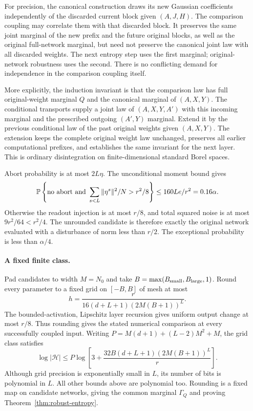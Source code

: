 For precision, the canonical construction draws its new Gaussian coefficients
independently of the discarded current block given $(A,J,H)$. The comparison
coupling may correlate them with that discarded block. It preserves the same
joint marginal of the new prefix and the future original blocks, as well as
the original full-network marginal, but need not preserve the canonical joint
law with all discarded weights. The next entropy step uses the first marginal;
original-network robustness uses the second. There is no conflicting demand
for independence in the comparison coupling itself.

More explicitly, the induction invariant is that the comparison law has
full original-weight marginal $Q$ and the canonical marginal of
$(A,X,Y)$. The conditional transports supply a joint law of
$(A,X,Y,A')$ with this incoming marginal and the prescribed outgoing
$(A',Y)$ marginal. Extend it by the previous conditional law of the past
original weights given $(A,X,Y)$. The extension keeps the complete original
weight law unchanged, preserves all earlier computational prefixes, and
establishes the same invariant for the next layer. This is ordinary
disintegration on finite-dimensional standard Borel spaces.

Abort probability is at most $2L\eta$. The unconditional moment bound gives
\[
 \mathbb P\left\{\text{no abort and }\sum_{s<L}\|\eta^s\|^2/N>r^2/8\right\}
 \le160Le/r^2=0.16\alpha.
\]
Otherwise the readout injection is at most $r/8$, and total squared noise is
at most $9r^2/64<r^2/4$. The unrounded candidate is therefore exactly the
original network evaluated with a disturbance of norm less than $r/2$.
The exceptional probability is less than $\alpha/4$.

\paragraph{A fixed finite class.}
Pad candidates to width $M=N_0$ and take
$B=\max(B_{\rm small},B_{\rm large},1)$. Round every parameter to a fixed
grid on $[-B,B]$ of mesh at most
\[
 h=\frac{r}{16(d+L+1)(2M(B+1))^L}.
\]
The bounded-activation, Lipschitz layer recursion gives uniform output change
at most $r/8$. Thus rounding gives the stated numerical comparison at every
successfully coupled input.
Writing $P=M(d+1)+(L-2)M^2+M$, the grid class satisfies
\[
 \log|\mathcal H|\le
 P\log\left[3+\frac{32B(d+L+1)(2M(B+1))^L}{r}\right].
\]
Although grid precision is exponentially small in $L$, its number of bits is
polynomial in $L$. All other bounds above are polynomial too. Rounding is a
fixed map on candidate networks, giving the common marginal $\Gamma_Q$ and
proving Theorem~\ref{thm:robust-entropy}.

